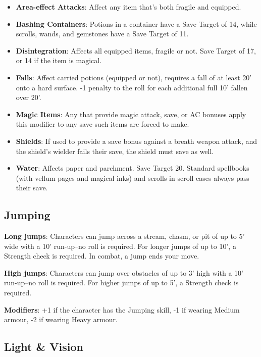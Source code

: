 \documentclass{book}
\providecommand{\tightlist}{%
\setlength{\itemsep}{0pt}\setlength{\parskip}{0pt}}
\begin{document}
\begin{itemize}
\tightlist
\item
  \textbf{Area-effect Attacks}: Affect any item that's both fragile and
  equipped.
\item
  \textbf{Bashing Containers}: Potions in a container have a Save Target
  of 14, while scrolls, wands, and gemstones have a Save Target of 11.
\item
  \textbf{Disintegration}: Affects all equipped items, fragile or not.
  Save Target of 17, or 14 if the item is magical.
\item
  \textbf{Falls}: Affect carried potions (equipped or not), requires a
  fall of at least 20' onto a hard surface. -1 penalty to the roll for
  each additional full 10' fallen over 20'.
\item
  \textbf{Magic Items}: Any that provide magic attack, save, or AC
  bonuses apply this modifier to any save such items are forced to make.
\item
  \textbf{Shields}: If used to provide a save bonus against a breath
  weapon attack, and the shield's wielder fails their save, the shield
  must save as well.
\item
  \textbf{Water}: Affects paper and parchment. Save Target 20. Standard
  spellbooks (with vellum pages and magical inks) and scrolls in scroll
  cases always pass their save.
\end{itemize}

\subsection*{Jumping}\label{jumping}

\textbf{Long jumps}: Characters can jump across a stream, chasm, or pit
of up to 5' wide with a 10' run-up--no roll is required. For longer
jumps of up to 10', a Strength check is required. In combat, a jump ends
your move.

\textbf{High jumps}: Characters can jump over obstacles of up to 3' high
with a 10' run-up--no roll is required. For higher jumps of up to 5', a
Strength check is required.

\textbf{Modifiers}: +1 if the character has the Jumping skill, -1 if
wearing Medium armour, -2 if wearing Heavy armour.

\subsection*{Light \& Vision}\label{light-vision}
\end{document}

